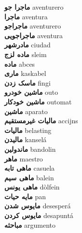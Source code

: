 \textbf{ ماجرا جو  } aventurero \\
\textbf{ ماجرا  } aventura \\
\textbf{ ماجراجو  } aventurero \\
\textbf{ ماجراجویی  } aventura \\
\textbf{ مادرشهر  } ciudad \\
\textbf{ ماده لزج  } sleim \\
\textbf{ ماده  } abces \\
\textbf{ ماری  } kaskabel \\
\textbf{ ماسک زدن  } fingi \\
\textbf{ ماشین خودرو  } outo \\
\textbf{ ماشین خودکار  } outomat \\
\textbf{ ماشین  } aparato \\
\textbf{ مالیات غیرمستقیم  } accijns \\
\textbf{ مالیات  } belasting \\
\textbf{ مالیدن  } kanselá \\
\textbf{ ماندولین  } bandolin \\
\textbf{ ماهر  } maestro \\
\textbf{ ماهی تابه  } casuela \\
\textbf{ ماهی سیم  } balein \\
\textbf{ ماهی یونس  } dòlfein \\
\textbf{ مایه حیات  } pan \\
\textbf{ مایوس شدن  } desesperá \\
\textbf{ مایوس کردن  } desapuntá \\
\textbf{ مباحثه  } argumento \\
